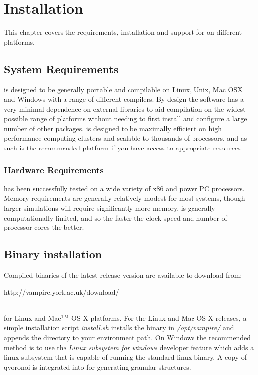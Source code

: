 \chapter{Installation}\label{chap:installation}

This chapter covers the requirements, installation and support for \vampire on different platforms. 

\section*{System Requirements}
\vampire is designed to be generally portable and compilable on Linux, Unix, Mac OSX and Windows with a range of different compilers. By design the software has a very minimal dependence on external libraries to aid compilation on the widest possible range of platforms without needing to first install and configure a large number of other packages. \vampire is designed to be maximally efficient on high performance computing clusters and scalable to thousands of processors, and as such is the recommended platform if you have access to appropriate resources. 

\subsection*{Hardware Requirements}
\vampire has been successfully tested on a wide variety of x86 and power PC processors. Memory requirements are generally relatively modest for most systems, though larger simulations will require significantly more memory. \vampire is generally computationally limited, and so the faster the clock speed and number of processor cores the better.

\section*{Binary installation}
Compiled binaries of the latest release version are available to download from:\\

\begin{minipage}[c]{\textwidth}
\centering
http://vampire.york.ac.uk/download/
\end{minipage}\\

\noindent for Linux and Mac$^{\mathrm{TM}}$ OS X platforms. For the Linux and Mac OS X releases, a simple installation script \textit{install.sh} installs the binary in \textit{/opt/vampire/} and appends the directory to your environment path. On Windows the recommended method is to use the \textit{Linux subsystem for windows} developer feature which adds a linux subsystem that is capable of running the standard linux binary. A copy of qvoronoi is integrated into \vampire for generating granular structures. 


